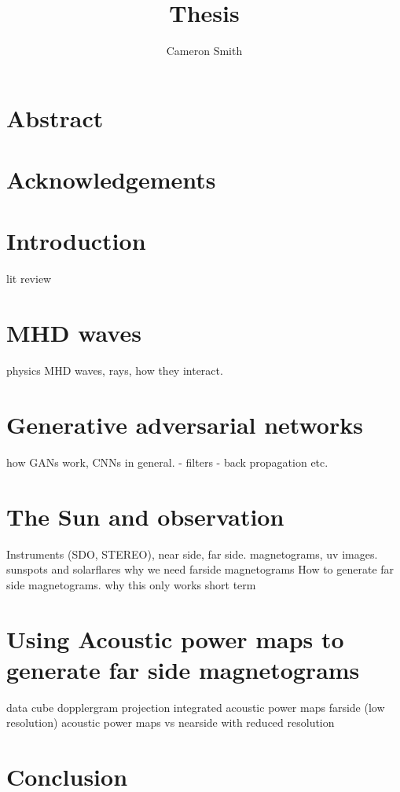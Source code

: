\documentclass[12pt]{report}
\title{Thesis}
\author{Cameron Smith}
\begin{document}
\maketitle

\chapter*{Abstract}



\chapter*{Acknowledgements}

\tableofcontents

\chapter{Introduction}
lit review

\chapter{MHD waves}
physics MHD waves, rays, how they interact.

\chapter{Generative adversarial networks}
how GANs work, CNNs in general.
- filters
- back propagation
etc.
\chapter{The Sun and observation}
Instruments (SDO, STEREO), near side, far side. magnetograms, uv images.
sunspots and solarflares
why we need farside magnetograms
How to generate far side magnetograms.
why this only works short term

\chapter{Using Acoustic power maps to generate far side magnetograms}
data cube dopplergram projection
integrated acoustic power maps
farside (low resolution) acoustic power maps
vs nearside with reduced resolution

\chapter{Conclusion}
\end{document}
